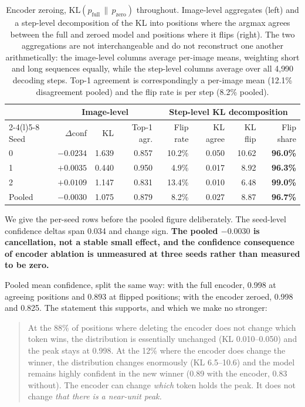 \documentclass{article}
\begin{document}
\begin{table}[h]
\small
\centering
\caption{Encoder zeroing, $\mathrm{KL}(p_{\text{full}}\,\|\,p_{\text{zero}})$ throughout.
Image-level aggregates (left) and a step-level decomposition of the KL into positions where the
argmax agrees between the full and zeroed model and positions where it flips (right). The two
aggregations are not interchangeable and do not reconstruct one another arithmetically: the
image-level columns average per-image means, weighting short and long sequences equally, while
the step-level columns average over all 4{,}990 decoding steps. Top-1 agreement is
correspondingly a per-image mean (12.1\% disagreement pooled) and the flip rate is per step
(8.2\% pooled).}
\label{tab:ablation}
\setlength{\tabcolsep}{4pt}
\begin{tabular}{lrrr@{\hskip 16pt}rrrr}
\toprule
& \multicolumn{3}{c}{Image-level} & \multicolumn{4}{c}{Step-level KL decomposition} \\
\cmidrule(r){2-4}\cmidrule(l){5-8}
Seed & $\Delta$conf & KL & Top-1 agr. & Flip rate & KL agree & KL flip & Flip share \\
\midrule
0 & $-0.0234$ & 1.639 & 0.857 & 10.2\% & 0.050 & 10.62 & \textbf{96.0\%} \\
1 & $+0.0035$ & 0.440 & 0.950 & 4.9\%  & 0.017 & 8.92  & \textbf{96.3\%} \\
2 & $+0.0109$ & 1.147 & 0.831 & 13.4\% & 0.010 & 6.48  & \textbf{99.0\%} \\
\midrule
Pooled & $-0.0030$ & 1.075 & 0.879 & 8.2\% & 0.027 & 8.87 & \textbf{96.7\%} \\
\bottomrule
\end{tabular}
\end{table}

We give the per-seed rows before the pooled figure deliberately. The seed-level confidence
deltas span 0.034 and change sign. \textbf{The pooled $-0.0030$ is cancellation, not a stable
small effect, and the confidence consequence of encoder ablation is unmeasured at three seeds
rather than measured to be zero.}

Pooled mean confidence, split the same way: with the full encoder, 0.998 at agreeing positions
and 0.893 at flipped positions; with the encoder zeroed, 0.998 and 0.825. The statement this
supports, and which we make no stronger:

\begin{quote}
At the 88\% of positions where deleting the encoder does not change which token wins, the
distribution is essentially unchanged (KL 0.010--0.050) and the peak stays at 0.998. At the
12\% where the encoder does change the winner, the distribution changes enormously (KL
6.5--10.6) and the model remains highly confident in the new winner (0.89 with the encoder,
0.83 without). The encoder can change \emph{which} token holds the peak. It does not change
\emph{that there is a near-unit peak.}
\end{quote}
\end{document}
